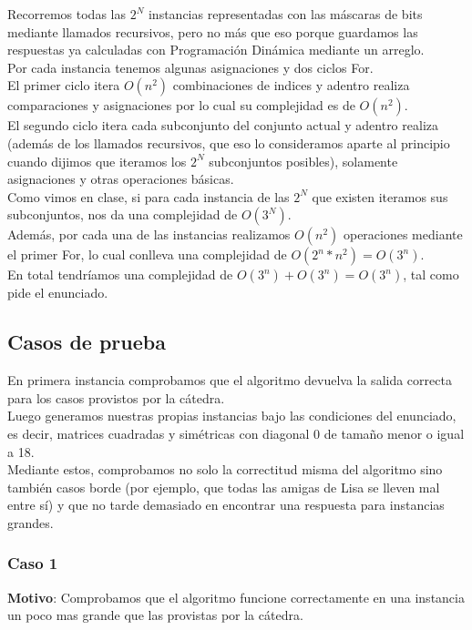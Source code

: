 Recorremos todas las $2^N$ instancias representadas con las máscaras de bits mediante llamados recursivos, pero no más que eso porque guardamos las respuestas ya calculadas con Programación Dinámica mediante un arreglo. \\
Por cada instancia tenemos algunas asignaciones y dos ciclos For.\\
El primer ciclo itera $O(n^2)$ combinaciones de indices y adentro realiza comparaciones y asignaciones por lo cual su complejidad es de $O(n^2)$. \\
El segundo ciclo itera cada subconjunto del conjunto actual y adentro realiza (además de los llamados recursivos, que eso lo consideramos aparte al principio cuando dijimos que iteramos los $2^N$ subconjuntos posibles), solamente asignaciones y otras operaciones básicas. \\
Como vimos en clase, si para cada instancia de las $2^N$ que existen iteramos sus subconjuntos, nos da una complejidad de $O(3^N)$.\\
Además, por cada una de las instancias realizamos $O(n^2)$ operaciones mediante el primer For, lo cual conlleva una complejidad de $O(2^n * n^2) = O(3^n)$. \\
En total tendríamos una complejidad de $O(3^n) + O(3^n) = O(3^n)$, tal como pide el enunciado.

\subsection{Casos de prueba}

En primera instancia comprobamos que el algoritmo devuelva la salida correcta para los casos provistos por la cátedra. \\
Luego generamos nuestras propias instancias bajo las condiciones del enunciado, es decir, matrices cuadradas y simétricas con diagonal 0 de tamaño menor o igual a 18. \\
Mediante estos, comprobamos no solo la correctitud misma del algoritmo sino también casos borde 
(por ejemplo, que todas las amigas de Lisa se lleven mal entre sí) 
y que no tarde demasiado en encontrar una respuesta para instancias grandes.


\subsubsection*{Caso 1}

\textbf{Motivo}: Comprobamos que el algoritmo funcione correctamente en una instancia un poco mas grande que las provistas por la cátedra. \\

